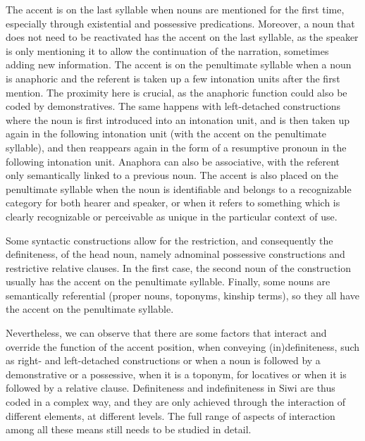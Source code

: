 \documentclass[output=paper]{langsci/langscibook}
\begin{document}
{
The accent is on the last syllable when nouns are mentioned for the first time, especially through existential and possessive predications. Moreover, a noun that does not need to be reactivated has the accent on the last syllable, as the speaker is only mentioning it to allow the continuation of the narration, sometimes adding new information. The accent is on the penultimate syllable when a noun is anaphoric and the referent is taken up a few intonation units after the first mention. The proximity here is crucial, as the anaphoric function could also be coded by demonstratives. The same happens with left-detached constructions where the noun is first introduced into an intonation unit, and is then taken up again in the following intonation unit (with the accent on the penultimate syllable), and then reappears again in the form of a resumptive pronoun in the following intonation unit. Anaphora can also be associative, with the referent only semantically linked to a previous noun. The accent is also placed on the penultimate syllable when the noun is identifiable and belongs to a recognizable category for both hearer and speaker, or when it refers to something which is clearly recognizable or perceivable as unique in the particular context of use.
}

Some syntactic constructions allow for the restriction, and consequently the definiteness, of the head noun, namely adnominal possessive constructions and restrictive relative clauses. In the first case, the second noun of the construction usually has the accent on the penultimate syllable. Finally, some nouns are semantically referential (proper nouns, toponyms, kinship terms), so they all have the accent on the penultimate syllable.

Nevertheless, we can observe that there are some factors that interact and override the function of the accent position, when conveying (in)definiteness, such as right- and left-detached constructions or when a noun is followed by a demonstrative or a possessive, when it is a toponym, for locatives or when it is followed by a relative clause. Definiteness and indefiniteness in Siwi are thus coded in a complex way, and they are only achieved through the interaction of different elements, at different levels. The full range of aspects of interaction among all these means still needs to be studied in detail.
\end{document}
